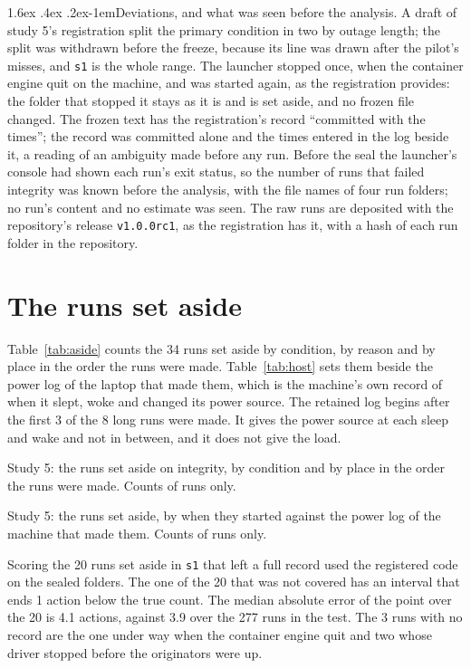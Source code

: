 \documentclass[11pt]{article}
\makeatletter
\renewcommand\paragraph{\@startsection{paragraph}{4}{\z@}%
  {1.6ex \@plus .4ex \@minus .2ex}{-1em}{\normalfont\normalsize\bfseries}}
\makeatother
\begin{document}
\paragraph{Deviations, and what was seen before the analysis.} A draft of study 5's
registration split the primary condition in two by outage length; the split was
withdrawn before the freeze, because its line was drawn after the pilot's misses, and
\texttt{s1} is the whole range. The launcher stopped once, when the container engine
quit on the machine, and was started again, as the registration provides: the folder
that stopped it stays as it is and is set aside, and no frozen file changed. The frozen
text has the registration's record ``committed with the times''; the record was
committed alone and the times entered in the log beside it, a reading of an ambiguity
made before any run. Before the seal the launcher's console had shown each run's exit
status, so the number of runs that failed integrity was known before the analysis, with
the file names of four run folders; no run's content and no estimate was seen. The raw
runs are deposited with the repository's release \texttt{v1.0.0rc1}, as the registration
has it, with a hash of each run folder in the repository.

\section{The runs set aside}
\label{app:aside}

Table~\ref{tab:aside} counts the 34 runs set aside by condition, by reason and by place
in the order the runs were made. Table~\ref{tab:host} sets them beside the power log of
the laptop that made them, which is the machine's own record of when it slept, woke and
changed its power source. The retained log begins after the first 3 of the 8 long runs
were made. It gives the power source at each sleep and wake and not in between, and it
does not give the load.

\begin{table}[!htb]
\centering\small

\caption{Study 5: the runs set aside on integrity, by condition and by place in the order
the runs were made. Counts of runs only.}
\label{tab:aside}
\end{table}

\begin{table}[!htb]
\centering\small

\caption{Study 5: the runs set aside, by when they started against the power log of the
machine that made them. Counts of runs only.}
\label{tab:host}
\end{table}

Scoring the 20 runs set aside in \texttt{s1} that left a full record used the registered
code on the sealed folders. The one of the 20 that was not covered has an interval that
ends 1 action below the true count. The median absolute error of the point over the 20
is 4.1 actions, against 3.9 over the 277 runs in the test. The 3 runs with no record are
the one under way when the container engine quit and two whose driver stopped before
the originators were up.
\end{document}
